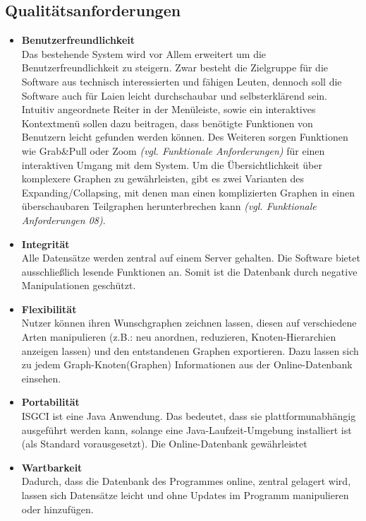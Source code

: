 \documentclass[11pt,a4paper]{article}
\begin{document}
	\subsection{Qualitätsanforderungen} %
		\begin{itemize}	
		\item \textbf{Benutzerfreundlichkeit}\\
		Das bestehende System wird vor Allem erweitert um die Benutzerfreundlichkeit zu steigern. Zwar besteht die Zielgruppe für die Software aus technisch interessierten und fähigen Leuten, dennoch soll die Software auch für Laien leicht durchschaubar und selbsterklärend sein. Intuitiv angeordnete Reiter in der Menüleiste, sowie ein interaktives Kontextmenü sollen dazu beitragen, dass benötigte Funktionen von Benutzern leicht gefunden werden können. Des Weiteren sorgen Funktionen wie Grab\&Pull oder Zoom \textit{(vgl. Funktionale Anforderungen)} für einen interaktiven Umgang mit dem System. Um die Übersichtlichkeit über komplexere Graphen zu gewährleisten, gibt es zwei Varianten des Expanding/Collapsing, mit denen man einen komplizierten Graphen in einen überschaubaren Teilgraphen herunterbrechen kann \textit{(vgl. Funktionale Anforderungen 08)}.
		\item \textbf{Integrität}\\
		Alle Datensätze werden zentral auf einem Server gehalten. Die Software bietet ausschließlich lesende Funktionen an. Somit ist die Datenbank durch negative Manipulationen geschützt.
		\item \textbf{Flexibilität}\\
		Nutzer können ihren Wunschgraphen zeichnen lassen, diesen auf verschiedene Arten manipulieren (z.B.: neu anordnen, reduzieren, Knoten-Hierarchien anzeigen lassen) und den entstandenen Graphen exportieren. Dazu lassen sich zu jedem Graph-Knoten(Graphen) Informationen aus der Online-Datenbank einsehen. 
		\item \textbf{Portabilität}\\
		ISGCI ist eine Java Anwendung. Das bedeutet, dass sie plattformunabhängig ausgeführt werden kann, solange eine Java-Laufzeit-Umgebung installiert ist (als Standard vorausgesetzt).
		Die Online-Datenbank gewährleistet 
		\item \textbf{Wartbarkeit}\\
		Dadurch, dass die Datenbank des Programmes online, zentral gelagert wird, lassen sich Datensätze leicht und ohne Updates im Programm manipulieren oder hinzufügen.
		\end{itemize}
		
\end{document}
